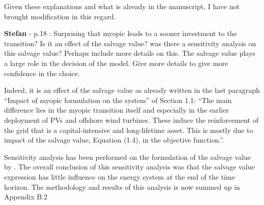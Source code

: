 \documentclass[12pt,a4paper]{article}
\begin{document}
Given these explanations and what is already in the manuscript, I have not brought modification in this regard.

\begin{mdframed}[style=comment] %
{\color{teal} \textbf{Stefan}} - p.18 : Surprising that myopic leads to a sooner investment to the transition? Is it an effect of the salvage value? was there a sensitivity analysis on this salvage value? Perhaps include more details on this. The salvage value plays a large role in the decision of the model. Give more details to give more confidence in the choice.
\end{mdframed}

\noindent Indeed, it is an effect of the salvage value as already written in the last paragraph ``Impact of myopic formulation on the system'' of Section 1.1: ``The main difference lies in the myopic transition itself and especially in the earlier
deployment of PVs and offshore wind turbines. These induce the reinforcement of the grid that is a capital-intensive and long-lifetime asset. This is mostly due to impact of the salvage value, Equation (1.4), in the objective function.''.

Sensitivity analysis has been performed on the formulation of the salvage value by \citet{goffauxpathway}. The overall conclusion of this sensitivity analysis was that the salvage value expression has little influence on the energy system at the end of the time horizon. The methodology and results of this analysis is now summed up {\color{blue}in Appendix B.2} 
\end{document}

